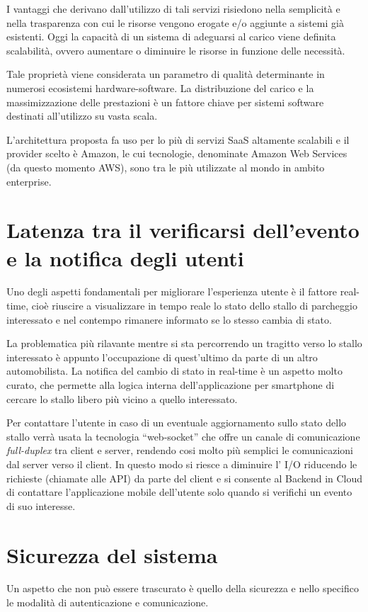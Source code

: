I vantaggi che derivano dall'utilizzo di tali servizi risiedono nella semplicità e nella trasparenza con cui le risorse vengono erogate e/o aggiunte a sistemi già esistenti. Oggi la capacità di un sistema di adeguarsi al carico viene definita scalabilità, ovvero aumentare o diminuire le risorse in funzione delle necessità.

Tale proprietà viene considerata un parametro di qualità determinante in numerosi ecosistemi hardware-software. La distribuzione del carico e la massimizzazione delle prestazioni è un fattore chiave per sistemi software destinati all'utilizzo su vasta scala.

L'architettura proposta fa uso per lo più di servizi SaaS altamente scalabili e il provider scelto è Amazon, le cui tecnologie, denominate Amazon Web Services (da questo momento AWS), sono tra le più utilizzate al mondo in ambito enterprise.


\section*{Latenza tra il verificarsi dell'evento e la notifica degli utenti}
Uno degli aspetti fondamentali per migliorare l'esperienza utente è il fattore real-time, cioè riuscire a visualizzare in tempo reale lo stato dello stallo di parcheggio interessato e nel contempo rimanere informato se lo stesso cambia di stato. 

La problematica più rilavante mentre si sta percorrendo un tragitto verso lo stallo interessato è appunto l'occupazione di quest'ultimo da parte di un altro automobilista. 
La notifica del cambio di stato in real-time è un aspetto molto curato, che permette alla logica interna dell'applicazione per smartphone di cercare lo stallo libero più vicino a quello interessato. 

Per contattare l'utente  in caso di un eventuale aggiornamento sullo stato dello stallo verrà usata la tecnologia ``web-socket'' che offre un canale di comunicazione {\itshape full-duplex} tra client e server, rendendo cosi molto più semplici le comunicazioni dal server verso il client. 
In questo modo si riesce a diminuire l' I/O riducendo le richieste (chiamate alle API) da parte del client e si consente al Backend in Cloud di contattare l'applicazione mobile dell'utente solo quando si verifichi un evento di suo interesse.

\section*{Sicurezza del sistema}
Un aspetto che non può essere trascurato è quello della sicurezza e nello specifico le modalità di autenticazione e comunicazione.


